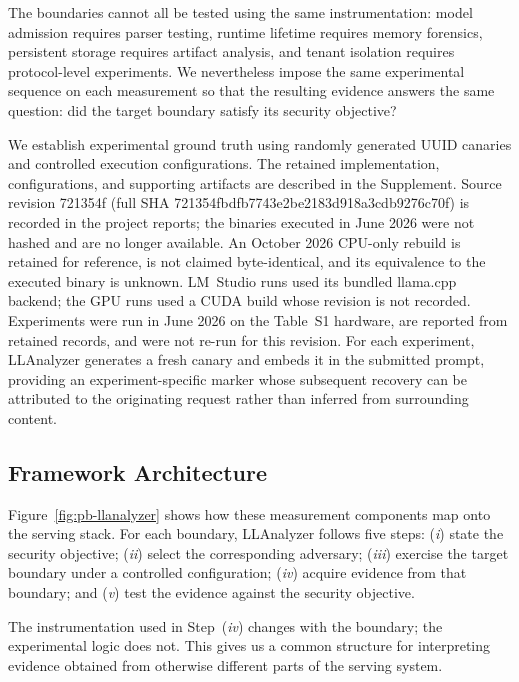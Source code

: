 \documentclass[journal,tifs]{IEEEtran}
\begin{document}
The boundaries cannot all be tested using the same instrumentation:
model admission requires parser testing, runtime lifetime requires memory
forensics, persistent storage requires artifact analysis, and tenant
isolation requires protocol-level experiments. We nevertheless impose
the same experimental sequence on each measurement so that the resulting
evidence answers the same question: did the target boundary satisfy its
security objective?

We establish experimental ground truth using randomly generated UUID
canaries and controlled execution configurations. The retained
implementation, configurations, and supporting artifacts are described in
the Supplement. Source revision 721354f (full SHA
721354fbdfb7743e2be2183d918a3cdb9276c70f) is recorded in the project
reports; the binaries executed in June 2026 were not hashed and are no
longer available. An October 2026 CPU-only rebuild is retained for
reference, is not claimed byte-identical, and its equivalence to the
executed binary is unknown. LM~Studio runs used its bundled llama.cpp backend; the
GPU runs used a CUDA build whose revision is not recorded. Experiments
were run in June 2026 on the Table~S1 hardware, are reported from retained
records, and were not re-run for this revision.
For each experiment, LLAnalyzer generates
a fresh canary and embeds it in the submitted prompt, providing an
experiment-specific marker whose subsequent recovery can be attributed
to the originating request rather than inferred from surrounding content.

\subsection{Framework Architecture}

Figure~\ref{fig:pb-llanalyzer} shows how these measurement components map
onto the serving stack. For each boundary, LLAnalyzer follows five steps:
(\textit{i}) state the security objective;
(\textit{ii}) select the corresponding adversary;
(\textit{iii}) exercise the target boundary under a controlled
configuration;
(\textit{iv}) acquire evidence from that boundary; and
(\textit{v}) test the evidence against the security objective.

The instrumentation used in Step~(\textit{iv}) changes with the boundary;
the experimental logic does not. This gives us a common structure for
interpreting evidence obtained from otherwise different parts of the
serving system.
\end{document}
